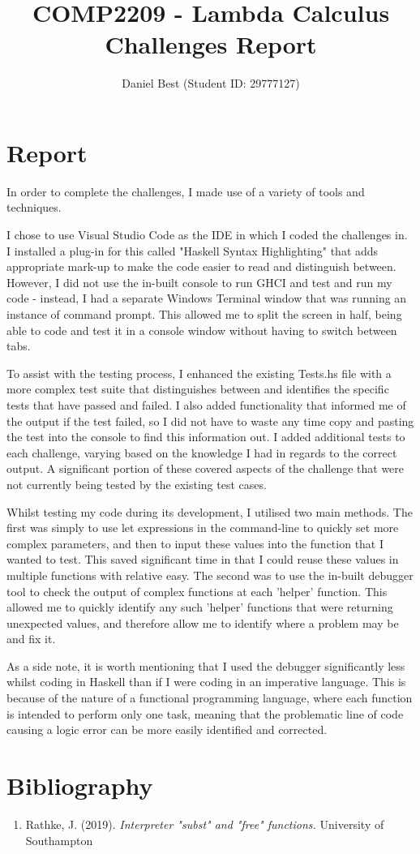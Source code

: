 \documentclass{article}
\title{COMP2209 - Lambda Calculus Challenges Report}
\author{Daniel Best (Student ID: 29777127)}
\begin{document}
	\maketitle
	
	\newpage
	
	\section{Report}
	In order to complete the challenges, I made use of a variety of tools and techniques. 
	
	I chose to use Visual Studio Code as the IDE in which I coded the challenges in. I installed a plug-in for this called "Haskell Syntax Highlighting" that adds appropriate mark-up to make the code easier to read and distinguish between. However, I did not use the in-built console to run GHCI and test and run my code - instead, I had a separate Windows Terminal window that was running an instance of command prompt. This allowed me to split the screen in half, being able to code and test it in a console window without having to switch between tabs.
	
	To assist with the testing process, I enhanced the existing Tests.hs file with a more complex test suite that distinguishes between and identifies the specific tests that have passed and failed. I also added functionality that informed me of the output if the test failed, so I did not have to waste any time copy and pasting the test into the console to find this information out. I added additional tests to each challenge, varying based on the knowledge I had in regards to the correct output. A significant portion of these covered aspects of the challenge that were not currently being tested by the existing test cases.
	
	Whilst testing my code during its development, I utilised two main methods. The first was simply to use let expressions in the command-line to quickly set more complex parameters, and then to input these values into the function that I wanted to test. This saved significant time in that I could reuse these values in multiple functions with relative easy. The second was to use the in-built debugger tool to check the output of complex functions at each 'helper' function. This allowed me to quickly identify any such 'helper' functions that were returning unexpected values, and therefore allow me to identify where a problem may be and fix it. 
	
	As a side note, it is worth mentioning that I used the debugger significantly less whilst coding in Haskell than if I were coding in an imperative language. This is because of the nature of a functional programming language, where each function is intended to perform only one task, meaning that the problematic line of code causing a logic error can be more easily identified and corrected.
	
	\newpage
	
	\section{Bibliography}
	\begin{enumerate}
		\item Rathke, J. (2019). \textit{Interpreter "subst" and "free" functions.} University of Southampton
	\end{enumerate}
	
\end{document}
